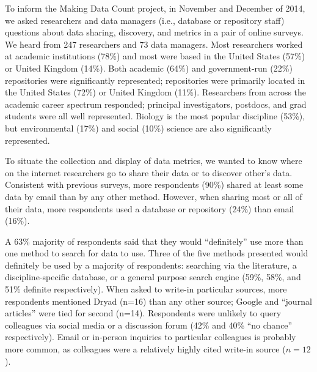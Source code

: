 \documentclass[english]{article}
\begin{document}
To inform the Making Data Count project, in November and December of 2014, we asked researchers and data managers (i.e., database or repository staff) questions about data sharing, discovery, and metrics in a pair of online surveys.
We heard from 247 researchers and 73 data managers.
Most researchers worked at academic institutions (78\%) and most were based in the United States (57\%) or United Kingdom (14\%).
Both academic (64\%) and government-run (22\%) repositories were significantly represented; repositories were primarily located in the United States (72\%) or United Kingdom (11\%).
Researchers from across the academic career spectrum responded; principal investigators, postdocs, and grad students were all well represented. 
Biology is the most popular discipline (53\%), but environmental (17\%) and social (10\%) science are also significantly represented. 


To situate the collection and display of data metrics, we wanted to know where on the internet researchers go to share their data or to discover other's data. 
Consistent with previous surveys\cite{@akers_disciplinary_2013, @wallis_if_2013, @kratz_researcher_2015}, more respondents (90\%) shared at least some data by email than by any other method. 
However, when sharing most or all of their data, more respondents used a database or repository (24\%) than email (16\%). 

A 63\% majority of respondents said that they would ``definitely'' use more than one method to search for data to use. 
Three of the five methods presented would definitely be used by a majority of respondents: searching via the literature, a discipline-specific database, or a general purpose search engine (59\%, 58\%, and 51\% definite respectively). 
When asked to write-in particular sources, more respondents mentioned Dryad (n=16) than any other source; Google and ``journal articles'' were tied for second (n=14). 
Respondents were unlikely to query colleagues via social media or a discussion forum (42\% and 40\% ``no chance'' respectively). 
Email or in-person inquiries to particular colleagues is probably more common, as colleagues were a relatively highly cited write-in source ($n=12$).

\end{document}
